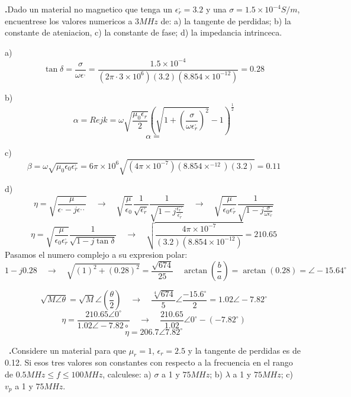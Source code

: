 \documentclass{article}
\newcounter{ejercicio}
\renewcommand{\theejercicio}{\arabic{ejercicio}}
\begin{document}
\noindent \textbf{\theejercicio.}Dado un material no magnetico que tenga un $\epsilon_r^,
=3.2$ y una $\sigma =1.5 \times 10^{-4} S/m$, encuentrese los valores 
numericos a $3MHz$ de: a) la tangente de perdidas; b) la constante de ateniacion,
c) la constante de fase; d) la impedancia intrinceca.
\vspace{0.5cm}

\noindent a) \[\tan \delta =\frac{\sigma}{\omega \epsilon^,}=\frac{1.5 \times 10^{-4}}{(2\pi \cdot 3 \times 10^6)(3.2)(8.854 \times 10^{-12})}=0.28\]

\vspace{0.5cm}

\noindent b) \[\alpha = Re{jk}=\omega \sqrt{\frac{\mu_0 \epsilon _r}{2}} \left( \sqrt{1+\left( \frac{\sigma}{\omega \epsilon_r^,} \right)^2}-1 \right)^\frac{1}{2}\]
\[\alpha= \]

\vspace{0.5cm}

\noindent c) \[\beta=\omega \sqrt{\mu_0\epsilon_0\epsilon_r^,}=6\pi \times 10^6\sqrt{(4\pi \times 10^{-7})(8.854 \times ^{-12})(3.2)}=0.11\]

\vspace{0.5cm}

\noindent d)\[\eta = \sqrt{\frac{\mu}{\epsilon^,-j\epsilon^{,,}}} \quad \rightarrow \quad \sqrt{\frac{\mu}{\epsilon_0}}\frac{1}{\sqrt{\epsilon_r^,}}\frac{1}{\sqrt{1-j\frac{\epsilon_r^{,,}}{\epsilon_r^,}}} \quad \rightarrow \quad \sqrt{\frac{\mu}{\epsilon_0\epsilon_r^,}}\frac{1}{\sqrt{1-j\frac{\sigma}{\omega \epsilon_r^,}}}\]
\[\eta =\sqrt{\frac{\mu}{\epsilon_0\epsilon_r^,}}\frac{1}{\sqrt{1-j\tan \delta }} \quad \rightarrow \quad \sqrt{\frac{4\pi \times 10^{-7}}{(3.2)(8.854 \times 10^{-12})}}=210.65 \]
Pasamos el numero complejo a su expresion polar:
\[1-j0.28 \quad \rightarrow \quad \sqrt{(1)^2+(0.28)^2}=\frac{\sqrt{674}}{25}\quad \arctan \left( \frac{b}{a} \right) = \arctan (0.28)= \angle -15.64^\circ\]

\[\sqrt{M\angle \theta}=\sqrt{M}\angle \left( \frac{\theta}{2}\right) \quad \rightarrow \quad \frac{\sqrt[4]{674}}{5}\angle \frac{-15.6^\circ}{2}=1.02\angle -7.82^\circ\]
\[\eta = \frac{210.65\angle 0^\circ}{1.02 \angle -7.82\circ} \quad \rightarrow \quad \frac{210.65}{1.02}\angle 0^\circ - (-7.82^\circ)\]
\[\eta = 206.7 \angle 7.82^\circ \]

\vspace{2cm}

\noindent\ \textbf{\theejercicio.}Considere un material para que $\mu_r=1$, $\epsilon_r=2.5$ y la tangente de perdidas es de 0.12. Si esos 
tres valores son constantes con respecto a la frecuencia en el rango de $0.5MHz \leq f \leq 100MHz$, calculese: a) $\sigma$ a 1 y $75MHz$;
b) $\lambda$ a 1 y $75MHz$; c) $v_p$ a 1 y $75MHz$.
\end{document}
